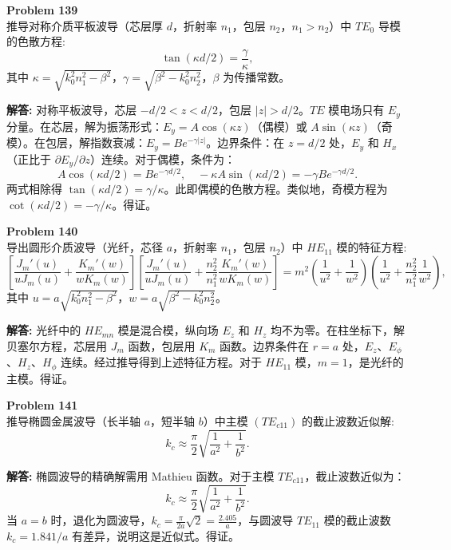 \documentclass[12pt, a4paper, oneside]{ctexart}
\newenvironment{solution}{\par\noindent\textbf{解答:}\quad}{\par}
\begin{document}
\begin{mdframed}[backgroundcolor=gray!10, linewidth=0pt]
    \textbf{Problem 139} \\
    推导对称介质平板波导（芯层厚 $d$，折射率 $n_1$，包层 $n_2$，$n_1>n_2$）中 $TE_0$ 导模的色散方程:
    \[
    \tan(\kappa d/2) = \frac{\gamma}{\kappa},
    \]
    其中 $\kappa = \sqrt{k_0^2 n_1^2 - \beta^2}$，$\gamma = \sqrt{\beta^2 - k_0^2 n_2^2}$，$\beta$ 为传播常数。
\end{mdframed}
\begin{solution}
    对称平板波导，芯层 $-d/2 < z < d/2$，包层 $|z| > d/2$。$TE$ 模电场只有 $E_y$ 分量。在芯层，解为振荡形式：$E_y = A \cos(\kappa z)$（偶模）或 $A \sin(\kappa z)$（奇模）。在包层，解指数衰减：$E_y = B e^{-\gamma |z|}$。边界条件：在 $z = d/2$ 处，$E_y$ 和 $H_x$（正比于 $\partial E_y/\partial z$）连续。对于偶模，条件为：
    \[
    A \cos(\kappa d/2) = B e^{-\gamma d/2}, \quad -\kappa A \sin(\kappa d/2) = -\gamma B e^{-\gamma d/2}.
    \]
    两式相除得 $\tan(\kappa d/2) = \gamma / \kappa$。此即偶模的色散方程。类似地，奇模方程为 $\cot(\kappa d/2) = -\gamma / \kappa$。得证。
\end{solution}

\begin{mdframed}[backgroundcolor=gray!10, linewidth=0pt]
    \textbf{Problem 140} \\
    导出圆形介质波导（光纤，芯径 $a$，折射率 $n_1$，包层 $n_2$）中 $HE_{11}$ 模的特征方程:
    \[
    \left[ \frac{J_m'(u)}{u J_m(u)} + \frac{K_m'(w)}{w K_m(w)} \right] \left[ \frac{J_m'(u)}{u J_m(u)} + \frac{n_2^2}{n_1^2} \frac{K_m'(w)}{w K_m(w)} \right] = m^2 \left( \frac{1}{u^2} + \frac{1}{w^2} \right) \left( \frac{1}{u^2} + \frac{n_2^2}{n_1^2} \frac{1}{w^2} \right),
    \]
    其中 $u = a \sqrt{k_0^2 n_1^2 - \beta^2}$，$w = a \sqrt{\beta^2 - k_0^2 n_2^2}$。
\end{mdframed}
\begin{solution}
    光纤中的 $HE_{mn}$ 模是混合模，纵向场 $E_z$ 和 $H_z$ 均不为零。在柱坐标下，解贝塞尔方程，芯层用 $J_m$ 函数，包层用 $K_m$ 函数。边界条件在 $r=a$ 处，$E_z$、$E_\phi$、$H_z$、$H_\phi$ 连续。经过推导得到上述特征方程。对于 $HE_{11}$ 模，$m=1$，是光纤的主模。得证。
\end{solution}

\begin{mdframed}[backgroundcolor=gray!10, linewidth=0pt]
    \textbf{Problem 141} \\
    推导椭圆金属波导（长半轴 $a$，短半轴 $b$）中主模 $(TE_{c11})$ 的截止波数近似解:
    \[
    k_c \approx \frac{\pi}{2} \sqrt{ \frac{1}{a^2} + \frac{1}{b^2} }.
    \]
\end{mdframed}
\begin{solution}
    椭圆波导的精确解需用 Mathieu 函数。对于主模 $TE_{c11}$，截止波数近似为：
    \[
    k_c \approx \frac{\pi}{2} \sqrt{ \frac{1}{a^2} + \frac{1}{b^2} }.
    \]
    当 $a=b$ 时，退化为圆波导，$k_c = \frac{\pi}{2a} \sqrt{2} = \frac{2.405}{a}$，与圆波导 $TE_{11}$ 模的截止波数 $k_c = 1.841/a$ 有差异，说明这是近似式。得证。
\end{solution}
\end{document}

